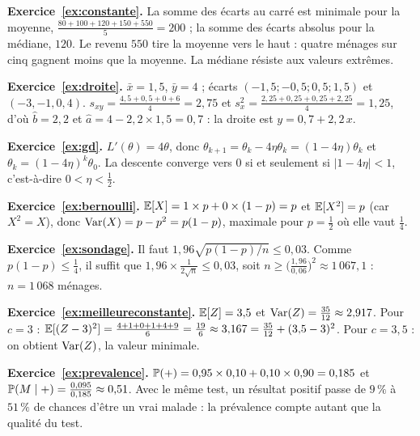 \begin{corrige}
\textbf{Exercice~\ref{ex:constante}.}
La somme des écarts au carré est minimale pour la moyenne, $\frac{80+100+120+150+550}{5}=200$ ; la somme des écarts absolus pour la médiane, $120$.
Le revenu $550$ tire la moyenne vers le haut : quatre ménages sur cinq gagnent moins que la moyenne. La médiane résiste aux valeurs extrêmes.
\end{corrige}

\begin{corrige}
\textbf{Exercice~\ref{ex:droite}.}
$\bar x=1{,}5$, $\bar y=4$ ; écarts $(-1{,}5;-0{,}5;0{,}5;1{,}5)$ et $(-3,-1,0,4)$.
$s_{xy}=\frac{4{,}5+0{,}5+0+6}{4}=2{,}75$ et $s_x^2=\frac{2{,}25+0{,}25+0{,}25+2{,}25}{4}=1{,}25$, d'où $\hat b=2{,}2$ et $\hat a=4-2{,}2\times1{,}5=0{,}7$ : la droite est $y=0{,}7+2{,}2\,x$.
\end{corrige}

\begin{corrige}
\textbf{Exercice~\ref{ex:gd}.}
$L'(\theta)=4\theta$, donc $\theta_{k+1}=\theta_k-4\eta\theta_k=(1-4\eta)\theta_k$ et $\theta_k=(1-4\eta)^k\theta_0$.
La descente converge vers $0$ si et seulement si $|1-4\eta|<1$, c'est-à-dire $0<\eta<\frac12$.
\end{corrige}

\begin{corrige}
\textbf{Exercice~\ref{ex:bernoulli}.}
$\E[X]=1\times p+0\times(1-p)=p$ et $\E[X^2]=p$ (car $X^2=X$), donc $\Var(X)=p-p^2=p(1-p)$, maximale pour $p=\frac12$ où elle vaut $\frac14$.
\end{corrige}

\begin{corrige}
\textbf{Exercice~\ref{ex:sondage}.}
Il faut $1{,}96\sqrt{p(1-p)/n}\le0{,}03$. Comme $p(1-p)\le\frac14$, il suffit que $1{,}96\times\frac{1}{2\sqrt n}\le0{,}03$, soit $n\ge\big(\frac{1{,}96}{0{,}06}\big)^2\approx1\,067{,}1$ : $n=1\,068$ ménages.
\end{corrige}

\begin{corrige}
\textbf{Exercice~\ref{ex:meilleureconstante}.}
$\E[Z]=3{,}5$ et $\Var(Z)=\frac{35}{12}\approx2{,}917$.
Pour $c=3$ : $\E[(Z-3)^2]=\frac{4+1+0+1+4+9}{6}=\frac{19}{6}\approx3{,}167=\frac{35}{12}+(3{,}5-3)^2$.
Pour $c=3{,}5$ : on obtient $\Var(Z)$, la valeur minimale.
\end{corrige}

\begin{corrige}
\textbf{Exercice~\ref{ex:prevalence}.}
$\P(+)=0{,}95\times0{,}10+0{,}10\times0{,}90=0{,}185$ et $\P(M\mid+)=\frac{0{,}095}{0{,}185}\approx0{,}51$.
Avec le même test, un résultat positif passe de $9\,\%$ à $51\,\%$ de chances d'être un vrai malade : la prévalence compte autant que la qualité du test.
\end{corrige}

